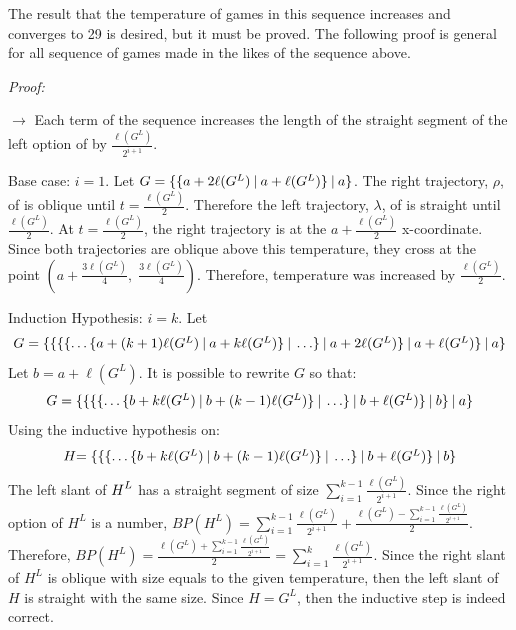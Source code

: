 The result that the temperature of games in this sequence increases and converges to 29 is desired, but it must be proved. The following proof is general for all sequence of games made in the likes of the sequence above.

\textit{Proof:} 
\begin{list}{}{}
	\item[$\rightarrow$] Each term of the sequence increases the length of the straight segment of the left option of  by $\frac{\ell(G^L)}{2^{i+1}}$.
	\item[ ] [Via Induction]
	\item[ ] Base case: $i=1$. Let $\mbox{$G=\mbox{$\{\mbox{$\{a + 2\ell(G^L)\:|\:a+\ell(G^L)\}$}\:|\:a\}$}$}$. The right trajectory, $\rho$, of  is oblique until $t=\frac{\ell(G^L)}{2}$. Therefore the left trajectory, $\lambda$, of \Gm{} is straight until $\frac{\ell(G^L)}{2}$. At $t=\frac{\ell(G^L)}{2}$, the right trajectory is at the $a + \frac{\ell(G^L)}{2}$ x-coordinate. Since both trajectories are oblique above this temperature, they cross at the point $(a + \frac{3\ell(G^L)}{4},\; \frac{3\ell(G^L)}{4})$. Therefore, temperature was increased by $\frac{\ell(G^L)}{2}$.
	\item[ ] Induction Hypothesis: $i=k$. Let 
	$$
	\mbox{$G=\mbox{$\{
			\mbox{$\{
				\mbox{$\{
					\mbox{$\{\ldots
						\mbox{$\{a + (k+1)\ell(G^L)\:|\:a + k\ell(G^L)\}$}
						\:|\:\ldots\}$}
					\:|\:a + 2\ell(G^L)\}$}
				\:|\:a+\ell(G^L)\}$}
			\:|\:a\}$}
		$}
	$$
	Let $b = a + \ell(G^L)$. It is possible to rewrite $G$ so that:
	$$
	\mbox{$G=\mbox{$\{
			\mbox{$\{
				\mbox{$\{
					\mbox{$\{\ldots
						\mbox{$\{b + k\ell(G^L)\:|\:b + (k-1)\ell(G^L)\}$}
					\:|\:\ldots\}$}
				\:|\:b+\ell(G^L)\}$}
			\:|\:b\}$}
		\:|\:a\}$}
	$}
	$$
	Using the inductive hypothesis on:
	$$
	\mbox{$H$}{=
			\mbox{$\{
				\mbox{$\{
					\mbox{$\{\ldots
						\mbox{$\{b + k\ell(G^L)\:|\:b + (k-1)\ell(G^L)\}$}
					\:|\:\ldots\}$}
				\:|\:b + \ell(G^L)\}$}
			\:|\:b\}$}
	}
	$$
	The left slant of $\mbox{$H$}^L$ has a straight segment of size $\sum\limits_{i=1}^{k-1} \frac{\ell(G^L)}{2^{i+1}}$. Since the right option of $H^L$ is a number, $BP(H^L)= \sum\limits_{i=1}^{k-1} \frac{\ell(G^L)}{2^{i+1}} + \frac{\ell(G^L) - \sum\limits_{i=1}^{k-1} \frac{\ell(G^L)}{2^{i+1}}}{2}$. Therefore, $BP(H^L)= \frac{\ell(G^L) + \sum\limits_{i=1}^{k-1} \frac{\ell(G^L)}{2^{i+1}}}{2} = \sum\limits_{i=1}^{k} \frac{\ell(G^L)}{2^{i+1}}$. Since the right slant of $H^L$ is oblique with size equals to the given temperature, then the left slant of $H$ is straight with the same size. Since $H = G^L$, then the inductive step is indeed correct.

\end{list}

